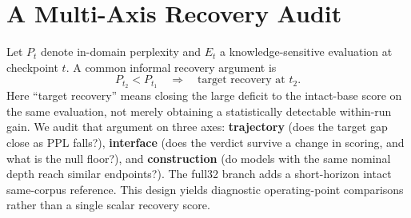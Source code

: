 \section{A Multi-Axis Recovery Audit}
\label{sec:observation}

Let $P_t$ denote in-domain perplexity and $E_t$ a knowledge-sensitive
evaluation at checkpoint $t$. A common informal recovery argument is
\[
P_{t_2}<P_{t_1}\quad\Longrightarrow\quad
\text{target recovery at }t_2 .
\]
Here ``target recovery'' means closing the large deficit to the intact-base
score on the same evaluation, not merely obtaining a statistically detectable
within-run gain. We audit that argument on three axes:
\textbf{trajectory} (does the target gap close as PPL falls?),
\textbf{interface} (does the verdict survive a change in scoring, and what is
the null floor?), and \textbf{construction} (do models with the same nominal
depth reach similar endpoints?). The full32 branch adds a short-horizon intact
same-corpus reference. This design yields diagnostic operating-point
comparisons rather than a single scalar recovery score.
